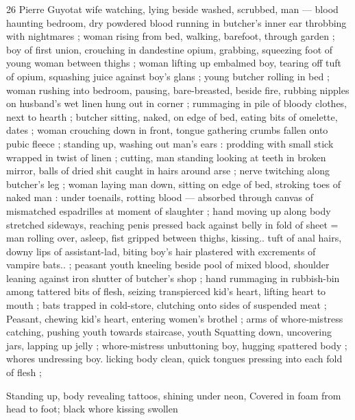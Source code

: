 26 Pierre Guyotat
wife watching, lying beside washed, scrubbed, man — blood
haunting bedroom, dry powdered blood running in butcher's inner
ear throbbing with nightmares ; woman rising from bed, walking,
barefoot, through garden ; boy of first union, crouching in
dandestine opium, grabbing, squeezing foot of young woman
between thighs ; woman lifting up embalmed boy, tearing off tuft of
opium, squashing juice against boy's glans ; young butcher rolling in
bed ; woman rushing into bedroom, pausing, bare-breasted, beside
fire, rubbing nipples on husband's wet linen hung out in corner ;
rummaging in pile of bloody clothes, next to hearth ; butcher sitting,
naked, on edge of bed, eating bits of omelette, dates ; woman
crouching down in front, tongue gathering crumbs fallen onto pubic
fleece ; standing up, washing out man's ears : prodding with small
stick wrapped in twist of linen ; cutting, man standing looking at teeth
in broken mirror, balls of dried shit caught in hairs around arse ;
nerve twitching along butcher's leg ; woman laying man down, sitting
on edge of bed, stroking toes of naked man : under toenails, rotting
blood — absorbed through canvas of mismatched espadrilles at
moment of slaughter ; hand moving up along body stretched
sideways, reaching penis pressed back against belly in fold of sheet
= man rolling over, asleep, fist gripped between thighs, kissing.. tuft
of anal hairs, downy lips of assistant-lad, biting boy's hair plastered
with excrements of vampire bats.. ; peasant youth kneeling beside
pool of mixed blood, shoulder leaning against iron shutter of
butcher's shop ; hand rummaging in rubbish-bin among tattered bits
of flesh, seizing transpierced kid's heart, lifting heart to mouth ; bats
trapped in cold-store, clutching onto sides of suspended meat ;
Peasant, chewing kid's heart, entering women's brothel ; arms of
whore-mistress catching, pushing youth towards staircase, youth
Squatting down, uncovering jars, lapping up jelly ; whore-mistress
unbuttoning boy, hugging spattered body ; whores undressing boy.
licking body clean, quick tongues pressing into each fold of flesh ;

Standing up, body revealing tattoos, shining under neon,
Covered in foam from head to foot; black whore kissing swollen

